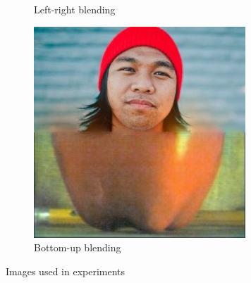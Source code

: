 \begin{figure}[h!]
\begin{subfigure}{0.33\textwidth}
  \caption{Left-right blending}
  \label{fig:blending-b}
\end{subfigure}%
\begin{subfigure}{0.33\textwidth}
  \centering
  \includegraphics[width=0.8\linewidth]{output/blending2.jpg}
  \caption{Bottom-up blending}
  \label{fig:blending-c}
\end{subfigure}%
 \caption{Images used in experiments}
\label{fig:blending}
\end{figure}




